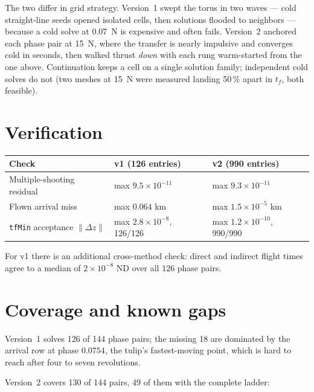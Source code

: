 \documentclass[11pt]{article}
\begin{document}
The two differ in grid strategy. Version~1 swept the torus in two waves ---
cold straight-line seeds opened isolated cells, then solutions flooded to
neighbors --- because a cold solve at 0.07~N is expensive and often fails.
Version~2 anchored each phase pair at 15~N, where the transfer is nearly
impulsive and converges cold in seconds, then walked thrust \emph{down} with
each rung warm-started from the one above. Continuation keeps a cell on a
single solution family; independent cold solves do not (two meshes at 15~N
were measured landing 50\,\% apart in $t_f$, both feasible).

\section{Verification}

\begin{center}
\begin{tabular}{lll}
\toprule
\textbf{Check} & \textbf{v1 (126 entries)} & \textbf{v2 (990 entries)} \\
\midrule
Multiple-shooting residual & max $9.5\times10^{-11}$ & max $9.3\times10^{-11}$ \\
Flown arrival miss & max $0.064$ km & max $1.5\times10^{-5}$ km \\
\texttt{tfMin} acceptance $\lVert\Delta z\rVert$ & max $2.8\times10^{-8}$, 126/126 & max $1.2\times10^{-10}$, 990/990 \\
\bottomrule
\end{tabular}
\end{center}

For v1 there is an additional cross-method check: direct and indirect flight
times agree to a median of $2\times10^{-8}$ ND over all 126 phase pairs.

\section{Coverage and known gaps}

Version~1 solves 126 of 144 phase pairs; the missing 18 are dominated by the
arrival row at phase $0.0754$, the tulip's fastest-moving point, which is hard
to reach after four to seven revolutions.

Version~2 covers 130 of 144 pairs, 49 of them with the complete ladder:
\end{document}
